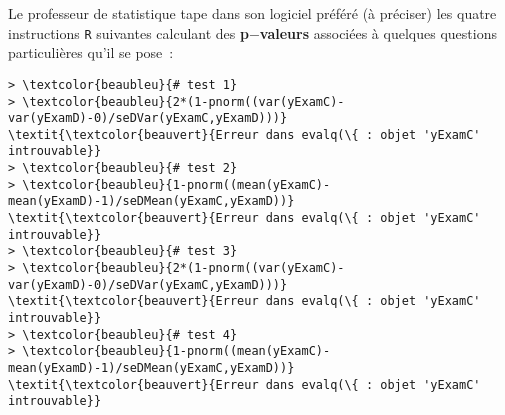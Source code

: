 \documentclass[]{article}
\begin{document}
Le professeur de statistique tape dans son logiciel préféré (à préciser) les quatre instructions \texttt{R} suivantes calculant des \textbf{p$-$valeurs} associées à quelques questions particuli{\`e}res qu'il se pose~:


\begin{Verbatim}[commandchars=\\\{\},fontfamily=courier,fontseries=b,fontsize=\small]
> \textcolor{beaubleu}{# test 1}
> \textcolor{beaubleu}{2*(1-pnorm((var(yExamC)-var(yExamD)-0)/seDVar(yExamC,yExamD)))}
\textit{\textcolor{beauvert}{Erreur dans evalq(\{ : objet 'yExamC' introuvable}}
> \textcolor{beaubleu}{# test 2}
> \textcolor{beaubleu}{1-pnorm((mean(yExamC)-mean(yExamD)-1)/seDMean(yExamC,yExamD))}
\textit{\textcolor{beauvert}{Erreur dans evalq(\{ : objet 'yExamC' introuvable}}
> \textcolor{beaubleu}{# test 3}
> \textcolor{beaubleu}{2*(1-pnorm((var(yExamC)-var(yExamD)-0)/seDVar(yExamC,yExamD)))}
\textit{\textcolor{beauvert}{Erreur dans evalq(\{ : objet 'yExamC' introuvable}}
> \textcolor{beaubleu}{# test 4}
> \textcolor{beaubleu}{1-pnorm((mean(yExamC)-mean(yExamD)-1)/seDMean(yExamC,yExamD))}
\textit{\textcolor{beauvert}{Erreur dans evalq(\{ : objet 'yExamC' introuvable}}
\end{Verbatim}
\end{document}
